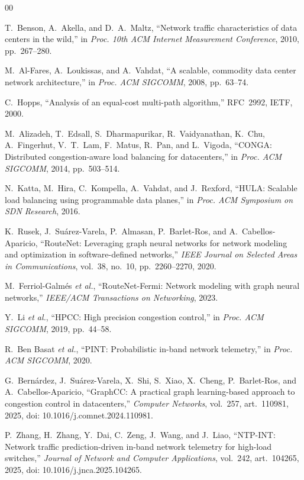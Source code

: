 \documentclass[conference]{IEEEtran}
\begin{document}
\begin{thebibliography}{00}

T.~Benson, A.~Akella, and D.~A.~Maltz, ``Network traffic characteristics of data centers in the wild,'' in \emph{Proc. 10th ACM Internet Measurement Conference}, 2010, pp.~267--280.

M.~Al-Fares, A.~Loukissas, and A.~Vahdat, ``A scalable, commodity data center network architecture,'' in \emph{Proc. ACM SIGCOMM}, 2008, pp.~63--74.

C.~Hopps, ``Analysis of an equal-cost multi-path algorithm,'' RFC~2992, IETF, 2000.

M.~Alizadeh, T.~Edsall, S.~Dharmapurikar, R.~Vaidyanathan, K.~Chu, A.~Fingerhut, V.~T.~Lam, F.~Matus, R.~Pan, and L.~Vigoda, ``CONGA: Distributed congestion-aware load balancing for datacenters,'' in \emph{Proc. ACM SIGCOMM}, 2014, pp.~503--514.

N.~Katta, M.~Hira, C.~Kompella, A.~Vahdat, and J.~Rexford, ``HULA: Scalable load balancing using programmable data planes,'' in \emph{Proc. ACM Symposium on SDN Research}, 2016.

K.~Rusek, J.~Su{\'a}rez-Varela, P.~Almasan, P.~Barlet-Ros, and A.~Cabellos-Aparicio, ``RouteNet: Leveraging graph neural networks for network modeling and optimization in software-defined networks,'' \emph{IEEE Journal on Selected Areas in Communications}, vol.~38, no.~10, pp.~2260--2270, 2020.

M.~Ferriol-Galm\'es \emph{et al.}, ``RouteNet-Fermi: Network modeling with graph neural networks,'' \emph{IEEE/ACM Transactions on Networking}, 2023.

Y.~Li \emph{et al.}, ``HPCC: High precision congestion control,'' in \emph{Proc. ACM SIGCOMM}, 2019, pp.~44--58.

R.~Ben Basat \emph{et al.}, ``PINT: Probabilistic in-band network telemetry,'' in \emph{Proc. ACM SIGCOMM}, 2020.

G.~Bern\'ardez, J.~Su{\'a}rez-Varela, X.~Shi, S.~Xiao, X.~Cheng, P.~Barlet-Ros, and A.~Cabellos-Aparicio, ``GraphCC: A practical graph learning-based approach to congestion control in datacenters,'' \emph{Computer Networks}, vol.~257, art.~110981, 2025, doi: 10.1016/j.comnet.2024.110981.

P.~Zhang, H.~Zhang, Y.~Dai, C.~Zeng, J.~Wang, and J.~Liao, ``NTP-INT: Network traffic prediction-driven in-band network telemetry for high-load switches,'' \emph{Journal of Network and Computer Applications}, vol.~242, art.~104265, 2025, doi: 10.1016/j.jnca.2025.104265.


\end{thebibliography}
\end{document}
